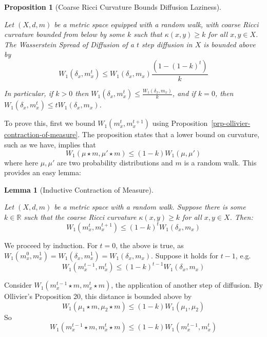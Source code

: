 \documentclass[
  letterpaper,
  DIV=11,
  numbers=noendperiod]{scrartcl}
\theoremstyle{plain}
\newtheorem{lemma}{Lemma}[section]
\theoremstyle{plain}
\newtheorem{proposition}{Proposition}[section]
\theoremstyle{definition}
\theoremstyle{definition}
\theoremstyle{remark}
\begin{document}
\begin{proposition}[Coarse Ricci Curvature Bounds Diffusion
Laziness]\protect\hypertarget{prp-coarse-ricci-curvature-bounds-diffusion-laziness}{}\label{prp-coarse-ricci-curvature-bounds-diffusion-laziness}

Let \((X,d,m)\) be a metric space equipped with a random walk, with
coarse Ricci curvature bounded from below by some \(k\) such that
\(\kappa(x,y) \geq k\) for all \(x,y \in X\). The Wasserstein Spread of
Diffusion of a \(t\) step diffusion in \(X\) is bounded above by \[
W_{1}(\delta_{x}, m_{x}^t) \leq W_1\left(\delta_x,m_x\right)\frac{(1-(1-k)^t)}{k}
\]

In particular, if \(k>0\) then
\(W_{1}(\delta_{x},m_{x}^t) \leq \frac{W_1\left(\delta_x,m_x\right)}{k}\),
and if \(k=0\), then
\(W_{1}(\delta_{x},m_{x}^t) \leq tW_1\left(\delta_x,m_x\right)\).

\end{proposition}

To prove this, first we bound \(W_{1}(m_{x}^t,m_{x}^{t+1})\) using
Proposition~\ref{prp-ollivier-contraction-of-measure}. The proposition
states that a lower bound on curvature, such as we have, implies that \[
W_{1}(\mu \star m, \mu' \star m) \leq (1-k)W_{1}(\mu, \mu')
\] where here \(\mu,\mu'\) are two probability distributions and \(m\)
is a random walk. This provides an easy lemma:

\begin{lemma}[Inductive Contraction of
Measure]\protect\hypertarget{lem-inductive-contraction-of-measure}{}\label{lem-inductive-contraction-of-measure}

Let \((X,d,m)\) be a metric space with a random walk. Suppose there is
some \(k \in \mathbb{R}\) such that the coarse Ricci curvature
\(\kappa(x,y) \geq k\) for all \(x,y \in X\). Then: \[
W_1\left(m_x^t, m_x^{t+1}\right) \leq(1-k)^t W_1\left(\delta_x,m_x\right)
\]

\end{lemma}

We proceed by induction. For \(t=0\), the above is true, as
\(W_{1}(m_{x}^0, m_{x}^{1}) =W_{1}(\delta_x, m_{x}^{1}) = W_1\left(\delta_x,m_x\right)\).
Suppose it holds for \(t-1\), e.g. \[
W_1\left(m_x^{t-1}, m_x^{t}\right) \leq(1-k)^{t-1} W_1\left(\delta_x,m_x\right)
\]

Consider \(W_1\left(m_x^{t-1}\star m, m_x^{t}\star m\right)\), the
application of another step of diffusion. By Ollivier's Proposition 20,
this distance is bounded above by \[
W_1\left(\mu_1 \star m, \mu_2 \star m\right) \leq(1-k) W_1\left(\mu_1, \mu_2\right)
\] So \[
W_1\left(m_x^{t-1}\star m, m_x^{t}\star m\right) \leq  (1-k)W_1\left(m_x^{t-1}, m_x^{t}\right)
\]
\end{document}
